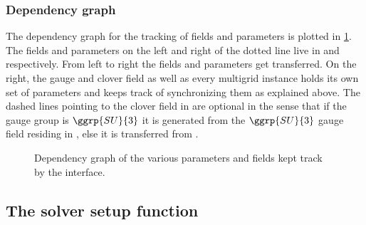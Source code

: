 \subsubsection{Dependency graph}

The dependency graph for the tracking of fields and parameters is plotted in \cref{fig:dep}.
The fields and parameters on the left and right of the dotted line live in \openqxd and \quda respectively.
From left to right the fields and parameters get transferred.
On the right, the gauge and clover field as well as every multigrid instance holds its own set of parameters and keeps track of synchronizing them as explained above.
The dashed lines pointing to the clover field in \quda are optional in the sense that if the gauge group is $\ggrp{SU}{3}$ it is generated from the $\ggrp{SU}{3}$ gauge field residing in \quda, else it is transferred from \openqxd.
\begin{figure}
  
  \caption{Dependency graph of the various parameters and fields kept track by the interface.}
  \label{fig:dep}
\end{figure}

\subsection{The solver setup function}
\label{sec:interface:getsolverhandle}

